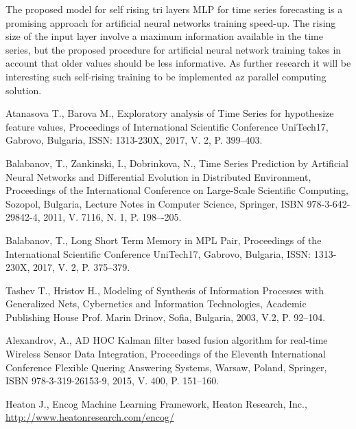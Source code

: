\documentclass[11pt]{article}
\begin{document}
The proposed model for self rising tri layers MLP for time series forecasting is a promising approach for artificial neural networks training speed-up. The rising size of the input layer involve a maximum information available in the time series, but the proposed procedure for artificial neural network training takes in account that older values should be less informative. As further research it will be interesting such self-rising training to be implemented az parallel computing solution. 

\begin{thebibliography}{99}

 Atanasova T., Barova M., Exploratory analysis of Time Series for hypothesize feature values, Proceedings of International Scientific Conference UniTech17, Gabrovo, Bulgaria, ISSN: 1313-230X, 2017, V. 2, P. 399--403.

 Balabanov, T., Zankinski, I., Dobrinkova, N., Time Series Prediction by Artificial Neural Networks and Differential Evolution in Distributed Environment, Proceedings of the International Conference on Large-Scale Scientific Computing, Sozopol, Bulgaria, Lecture Notes in Computer Science, Springer, ISBN 978-3-642-29842-4, 2011, V. 7116, N. 1, P. 198–-205. 

 Balabanov, T., Long Short Term Memory in MPL Pair, Proceedings of the  International Scientific Conference UniTech17, Gabrovo, Bulgaria, ISSN: 1313-230X, 2017, V. 2, P. 375--379.

 Tashev T., Hristov H., Modeling of Synthesis of Information Processes with Generalized Nets, Cybernetics and Information Technologies, Academic Publishing House Prof. Marin Drinov, Sofia, Bulgaria, 2003, V.2, P. 92--104.

 Alexandrov, A., AD HOC Kalman filter based fusion algorithm for real-time Wireless Sensor Data Integration, Proceedings of the Eleventh International Conference Flexible Quering Answering Systems, Warsaw, Poland, Springer, ISBN 978-3-319-26153-9, 2015, V. 400, P. 151--160.

 Heaton J., Encog Machine Learning Framework, Heaton Research, Inc., \url{http://www.heatonresearch.com/encog/}

\end{thebibliography}
\end{document}

